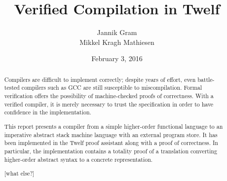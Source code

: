 \title{Verified Compilation in Twelf}
\author{Jannik Gram\\Mikkel Kragh Mathiesen}
\date{February 3, 2016}

\thispagestyle{empty}

\maketitle

\begin{abstract}
Compilers are difficult to implement correctly; despite years of effort, even battle-tested compilers such as GCC are still susceptible to miscompilation.
Formal verification offers the possibility of machine-checked proofs of correctness.
With a verified compiler, it is merely necessary to trust the specification in order to have confidence in the implementation.

This report presents a compiler from a simple higher-order functional language to an imperative abstract stack machine language with an external program store.
It has been implemented in the Twelf proof assistant along with a proof of correctness.
In particular, the implementation contains a totality proof of a translation converting higher-order abstract syntax to a concrete representation.

[what else?]
\end{abstract}

\clearpage

\thispagestyle{empty}

\tableofcontents

\clearpage

